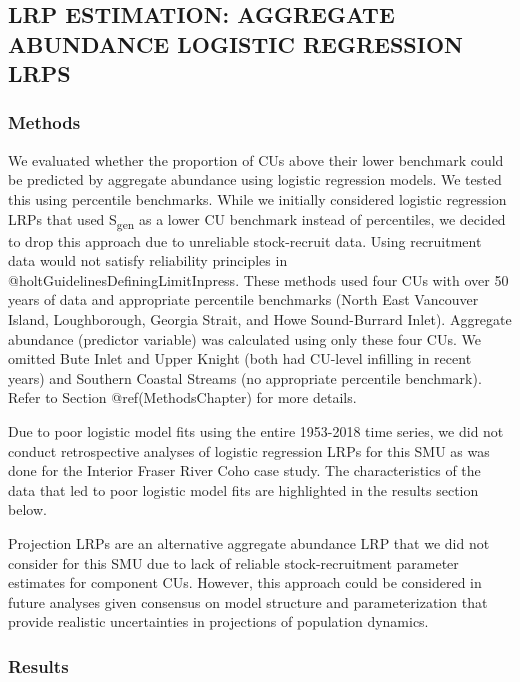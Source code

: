\documentclass[
]{article}
\begin{document}
\hypertarget{lrp-estimation-aggregate-abundance-logistic-regression-lrps}{%
\subsection{LRP ESTIMATION: AGGREGATE ABUNDANCE LOGISTIC REGRESSION
LRPS}\label{lrp-estimation-aggregate-abundance-logistic-regression-lrps}}

\hypertarget{methods-1}{%
\subsubsection{Methods}\label{methods-1}}

We evaluated whether the proportion of CUs above their lower benchmark
could be predicted by aggregate abundance using logistic regression
models. We tested this using percentile benchmarks. While we initially
considered logistic regression LRPs that used S\textsubscript{gen} as a
lower CU benchmark instead of percentiles, we decided to drop this
approach due to unreliable stock-recruit data. Using recruitment data
would not satisfy reliability principles in
@holtGuidelinesDefiningLimitInpress. These methods used four CUs with
over 50 years of data and appropriate percentile benchmarks (North East
Vancouver Island, Loughborough, Georgia Strait, and Howe Sound-Burrard
Inlet). Aggregate abundance (predictor variable) was calculated using
only these four CUs. We omitted Bute Inlet and Upper Knight (both had
CU-level infilling in recent years) and Southern Coastal Streams (no
appropriate percentile benchmark). Refer to Section @ref(MethodsChapter)
for more details.

Due to poor logistic model fits using the entire 1953-2018 time series,
we did not conduct retrospective analyses of logistic regression LRPs
for this SMU as was done for the Interior Fraser River Coho case study.
The characteristics of the data that led to poor logistic model fits are
highlighted in the results section below.

Projection LRPs are an alternative aggregate abundance LRP that we did
not consider for this SMU due to lack of reliable stock-recruitment
parameter estimates for component CUs. However, this approach could be
considered in future analyses given consensus on model structure and
parameterization that provide realistic uncertainties in projections of
population dynamics.

\hypertarget{results-1}{%
\subsubsection{Results}\label{results-1}}
\end{document}
